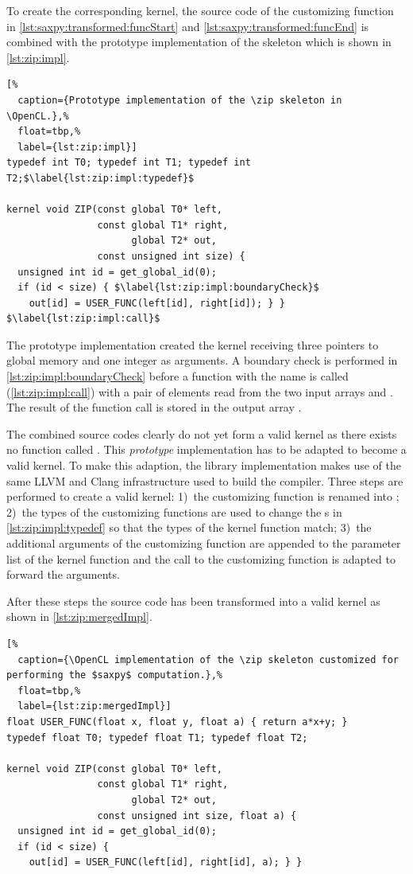 To create the corresponding \OpenCL kernel, the source code of the customizing function in \autoref{lst:saxpy:transformed:funcStart} and \autoref{lst:saxpy:transformed:funcEnd} is combined with the prototype implementation of the \zip skeleton which is shown in \autoref{lst:zip:impl}.
%
\begin{lstlisting}[%
  caption={Prototype implementation of the \zip skeleton in \OpenCL.},%
  float=tbp,%
  label={lst:zip:impl}]
typedef int T0; typedef int T1; typedef int T2;$\label{lst:zip:impl:typedef}$

kernel void ZIP(const global T0* left,
                const global T1* right,
                      global T2* out,
                const unsigned int size) {
  unsigned int id = get_global_id(0);
  if (id < size) { $\label{lst:zip:impl:boundaryCheck}$
    out[id] = USER_FUNC(left[id], right[id]); } }  $\label{lst:zip:impl:call}$
\end{lstlisting}
%
The prototype implementation created the \OpenCL kernel  receiving three pointers to global memory and one integer as arguments.
A boundary check is performed in \autoref{lst:zip:impl:boundaryCheck} before a function with the name  is called (\autoref{lst:zip:impl:call}) with a pair of elements read from the two input arrays  and .
The result of the function call is stored in the output array .

The combined source codes clearly do not yet form a valid \OpenCL kernel as there exists no function called .
This \emph{prototype} implementation has to be adapted to become a valid \OpenCL kernel.
To make this adaption, the \SkelCL library implementation makes use of the same LLVM and Clang infrastructure used to build the  compiler.
Three steps are performed to create a valid \OpenCL kernel:
1)~the customizing function is renamed into ;
2)~the types of the customizing functions are used to change the s in \autoref{lst:zip:impl:typedef} so that the types of the kernel function  match;
3)~the additional arguments of the customizing function are appended to the parameter list of the kernel function  and the call to the customizing function is adapted to forward the arguments.

After these steps the source code has been transformed into a valid \OpenCL kernel as shown in \autoref{lst:zip:mergedImpl}.
\begin{lstlisting}[%
  caption={\OpenCL implementation of the \zip skeleton customized for performing the $saxpy$ computation.},%
  float=tbp,%
  label={lst:zip:mergedImpl}]
float USER_FUNC(float x, float y, float a) { return a*x+y; }
typedef float T0; typedef float T1; typedef float T2;

kernel void ZIP(const global T0* left,
                const global T1* right,
                      global T2* out,
                const unsigned int size, float a) {
  unsigned int id = get_global_id(0);
  if (id < size) {
    out[id] = USER_FUNC(left[id], right[id], a); } }
\end{lstlisting}

